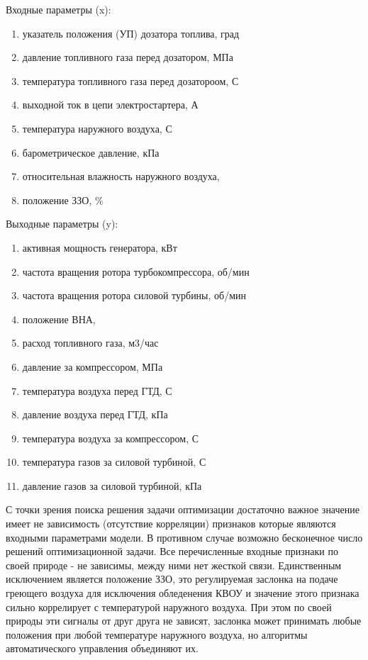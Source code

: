 \documentclass[12pt,a4paper]{article}
\begin{document}
\begin{description}
	\item Входные параметры (x):
	\begin{enumerate}
		\item указатель положения (УП) дозатора топлива, град
		\item давление топливного газа перед дозатором, МПа
		\item температура топливного газа перед дозатороом, \degree С
		\item выходной ток в цепи электростартера, А
		\item температура наружного воздуха, \degree С
		\item барометрическое давление, кПа
		\item относительная влажность наружного воздуха, %
		\item положение ЗЗО, \%

	\end{enumerate}
	\item Выходные параметры (y):
	\begin{enumerate}
		\item активная мощность генератора, кВт
		\item частота вращения ротора турбокомпрессора, об/мин
		\item частота вращения ротора силовой турбины, об/мин
		\item положение ВНА, \degree
		\item расход топливного газа, м3/час
		\item давление за компрессором, МПа
		\item температура воздуха перед ГТД, \degree С
		\item давление воздуха перед ГТД, кПа
		\item температура воздуха за компрессором, \degree С
		\item температура газов за силовой турбиной, \degree С
		\item давление газов за силовой турбиной, кПа
	\end{enumerate}
\end{description}

С точки зрения поиска решения задачи оптимизации достаточно важное значение имеет не зависимость (отсутствие корреляции) признаков которые являются входными параметрами модели. В противном случае возможно бесконечное число решений оптимизационной задачи. Все перечисленные входные признаки по своей природе - не зависимы, между ними нет жесткой связи. Единственным исключением является положение ЗЗО, это регулируемая заслонка на подаче греющего воздуха для исключения обледенения КВОУ и значение этого признака сильно коррелирует с температурой наружного воздуха. При этом по своей природы эти сигналы от друг друга не зависят, заслонка может принимать любые положения при любой температуре наружного воздуха, но алгоритмы автоматического управления объединяют их.
\end{document}
